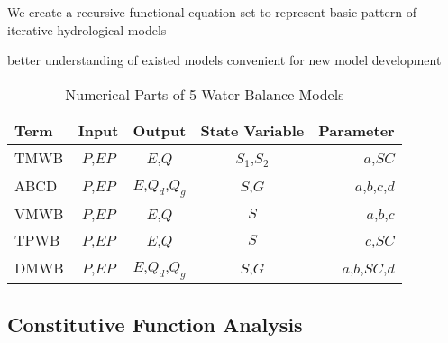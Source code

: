 We create a recursive functional equation set to represent basic pattern of iterative hydrological models
 
  better understanding of existed models
  convenient for new model development
 





\begin{table}[H]
\caption{Numerical Parts of 5 Water Balance Models}
\begin{center}
\begin{tabular}{lcccr}
\toprule[1.5 pt]
Term  & Input & Output & State Variable & Parameter  \\
\midrule[1 pt]
TMWB   & $P$,$EP$& $E$,$Q$        & $S_1$,$S_2$&$a$,$SC$        \\
ABCD   & $P$,$EP$& $E$,$Q_d$,$Q_g$& $S$,$G$    &$a$,$b$,$c$,$d$ \\
VMWB   & $P$,$EP$& $E$,$Q$        & $S$        &$a$,$b$,$c$     \\
TPWB   & $P$,$EP$& $E$,$Q$        & $S$        &$c$,$SC$        \\
DMWB   & $P$,$EP$& $E$,$Q_d$,$Q_g$&$S$,$G$     &$a$,$b$,$SC$,$d$\\
\bottomrule[1.5 pt]
\end{tabular}
\end{center}
\end{table}

\subsection{Constitutive Function Analysis}



